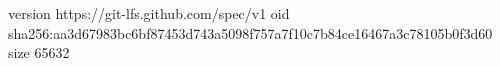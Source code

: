 version https://git-lfs.github.com/spec/v1
oid sha256:aa3d67983bc6bf87453d743a5098f757a7f10c7b84ce16467a3c78105b0f3d60
size 65632
